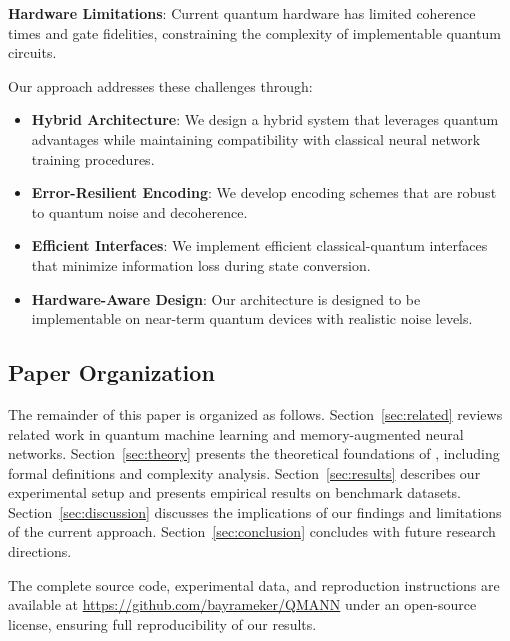 \textbf{Hardware Limitations}: Current quantum hardware has limited coherence times and gate fidelities, constraining the complexity of implementable quantum circuits.

Our approach addresses these challenges through:

\begin{itemize}
    \item \textbf{Hybrid Architecture}: We design a hybrid system that leverages quantum advantages while maintaining compatibility with classical neural network training procedures.
    
    \item \textbf{Error-Resilient Encoding}: We develop encoding schemes that are robust to quantum noise and decoherence.
    
    \item \textbf{Efficient Interfaces}: We implement efficient classical-quantum interfaces that minimize information loss during state conversion.
    
    \item \textbf{Hardware-Aware Design}: Our architecture is designed to be implementable on near-term quantum devices with realistic noise levels.
\end{itemize}

\subsection{Paper Organization}

The remainder of this paper is organized as follows. Section~\ref{sec:related} reviews related work in quantum machine learning and memory-augmented neural networks. Section~\ref{sec:theory} presents the theoretical foundations of \qmnn, including formal definitions and complexity analysis. Section~\ref{sec:results} describes our experimental setup and presents empirical results on benchmark datasets. Section~\ref{sec:discussion} discusses the implications of our findings and limitations of the current approach. Section~\ref{sec:conclusion} concludes with future research directions.

The complete source code, experimental data, and reproduction instructions are available at \url{https://github.com/bayrameker/QMANN} under an open-source license, ensuring full reproducibility of our results.

